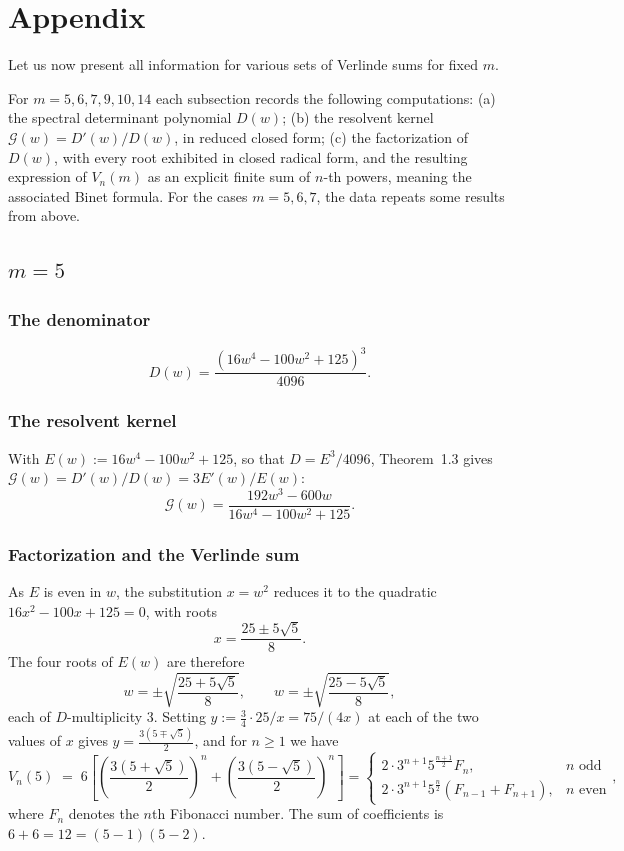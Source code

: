 \documentclass[11pt,reqno]{amsart}
\theoremstyle{remark}
\begin{document}
\section*{Appendix}
\label{sec:examples1}

Let us now present all information for various sets of Verlinde sums for fixed $m$.

For $m=5,6,7,9,10,14$ each subsection records the following computations:
(a) the spectral determinant polynomial $D(w)$; (b) the resolvent kernel $\mathcal G(w)=D'(w)/D(w)$, in reduced closed form;
(c) the factorization of $D(w)$, with every root exhibited in closed radical form, and the resulting expression of
$V_n(m)$ as an explicit finite sum of $n$-th powers, meaning the associated Binet formula. For the cases $m=5, 6, 7$, the data
repeats some results from above.

\subsection*{$m=5$}

\subsubsection*{The denominator}
\[
D(w) = \frac{(16w^4-100w^2+125)^3}{4096}.
\]

\subsubsection*{The resolvent kernel}
With $E(w):=16w^4-100w^2+125$, so that $D=E^3/4096$, Theorem~1.3 gives $
\mathcal G(w)=D'(w)/D(w)=3E'(w)/E(w)$:
\[
\mathcal G(w) = \frac{192w^3-600w}{16w^4-100w^2+125}.
\]

\subsubsection*{Factorization and the Verlinde sum}
As $E$ is even in $w$, the substitution $x=w^2$ reduces it to the quadratic $16x^2-100x+125=0$, with roots
\[
x = \frac{25\pm5\sqrt5}{8}.
\]
The four roots of $E(w)$ are therefore
\[
w = \pm\sqrt{\frac{25+5\sqrt5}{8}}, \qquad w = \pm\sqrt{\frac{25-5\sqrt5}{8}},
\]
each of $D$-multiplicity $3$. Setting $y := \tfrac{3}{4}\cdot25/x = 75/(4x)$ at each of the two values of $x$ gives $y=\tfrac{3(5\mp\sqrt5)}{2}$, and for $n\geq 1$ we have
\begin{equation}\label{vn of 5}
V_n(5) \;=\; 6\left[\left(\frac{3(5+\sqrt5)}{2}\right)^{\!n} + \left(\frac{3(5-\sqrt5)}{2}\right)^{\!n}\right]=\left\{
                                                  \begin{array}{ll}
                                                    2\cdot3^{n+1}5^{\frac{n+1}{2}}F_n, & n \text{  odd} \\
                                                    2\cdot3^{n+1}5^{\frac{n}{2}}(F_{n-1} + F_{n+1}), & n \text{  even}
                                                  \end{array}
                                                \right.,
\end{equation}
where $F_n$ denotes the $n$th Fibonacci number. The sum of coefficients is $6 + 6 = 12 = (5-1)(5-2)$.
\end{document}
